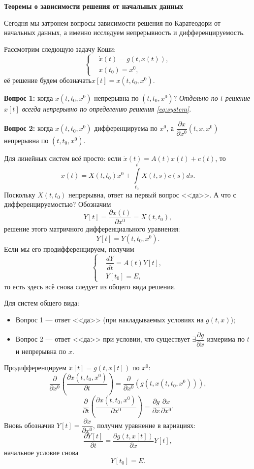 \documentclass[12pt, a4paper]{article}
\theoremstyle{rusdef}
\renewcommand{\d}{\partial} %
\begin{document}
\begin{center}
{\Huge \textbf{Теоремы о зависимости решения от начальных данных}}
\end{center}

Сегодня мы затронем вопросы зависимости решения по Каратеодори от начальных данных, а именно исследуем непрерывность и дифференцируемость.

Рассмотрим следющую задачу Коши:
\begin{equation}\label{eq:system}
\left\{
\begin{aligned}
& \dot{x}(t) = g(t, x(t)),\\
& x(t_0) = x^0,
\end{aligned}
\right.
\tag{ЗК}
\end{equation}
её решение будем обозначать$x[t] = x(t, t_0, x^0)$.

\textbf{Вопрос 1:} когда $x(t, t_0, x^0)$ непрерывна по $(t, t_0, x^0)$? \textit{Отдельно по $t$ решение $x[t]$ всегда непрерывно по определению решения \eqref{eq:system}}.

\textbf{Вопрос 2:} когда $x(t, t_0, x^0)$ дифференцируема по $x^0$, а $\dfrac{\d x}{\d x^0}(t, x, x^0)$ непрерывна по $(t, t_0, x^0)$.

Для линейных систем всё просто: если $\dot{x}(t) = A(t) x(t) + c(t)$, то
$$
x(t) = X(t, t_0) x^0 + \int\limits_{t_0}^{t} X(t,s) c(s) ds.
$$
Поскольку $X(t, t_0)$ непрерывна, ответ на первый вопрос <<да>>. А что с дифференцируемостью? Обозначим
$$
Y[t] = \dfrac{\d x(t)}{\d x^0} = X(t, t_0),
$$
решение этого матричного дифференциального уравнения:
$$
Y[t] = Y(t, t_0, x^0).
$$
Если мы его продифференцируем, получим
$$
\left\{
\begin{aligned}
& \dfrac{dY}{dt} = A(t) Y[t], \\
& Y[t_0] = E,
\end{aligned}
\right.
$$
то есть здесь всё снова следует из общего вида решения.

Для систем общего вида:
\begin{itemize}
\item Вопрос 1 --- ответ <<да>> (при накладываемых условиях на $g(t,x)$);
\item Вопрос 2 --- ответ <<да>> при условии, что существует $\exists \dfrac{\d g}{\d x}$ измерима по $t$ и непрерывна по $x$.
\end{itemize}

Продифференцируем $\dot{x}[t] = g(t, x[t])$ по $x^0$:
$$
\dfrac{\d}{\d x^0} \left( \dfrac{\d x(t, t_0, x^0)}{\d t} \right) = 
\dfrac{\d}{\d x^0} \left( g(t, x(t, t_0, x^0)) \right),
$$
$$
\dfrac{\d}{\d t} \left( \dfrac{\d x(t, t_0, x^0)}{\d x^0} \right) = 
\dfrac{\d g}{\d x} \frac{\d x}{\d x^0}.
$$
Вновь обозначив $Y[t] = \dfrac{\d x}{\d x^0}$, получим уравнение в вариациях:
$$
\dfrac{\d Y[t]}{\d t} = \dfrac{\d g(t, x[t])}{\d x} Y[t],
$$
начальное условие снова
$$
Y[t_0] = E.
$$
\end{document}

